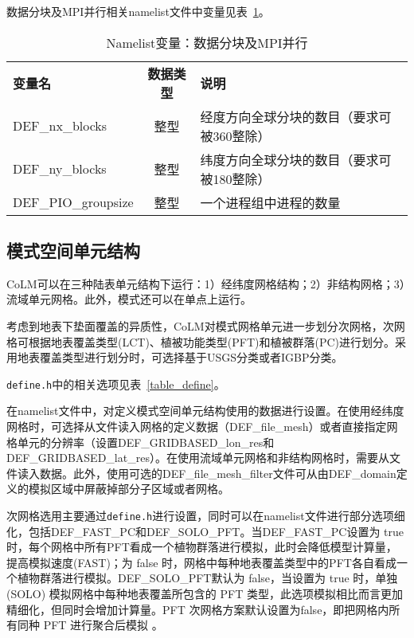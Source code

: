 \documentclass[a4paper,12pt,twoside]{article}
\begin{document}
数据分块及MPI并行相关namelist文件中变量见表~\ref{table_nl_blocks_mpi}。

\begin{table}[!htbp]
\caption{Namelist变量：数据分块及MPI并行} \label{table_nl_blocks_mpi}
\centering \renewcommand{\arraystretch}{1.5}
\begin{tabular}{lcl}
\toprule
\textbf{变量名} & \textbf{数据类型} & \textbf{说明} \\
DEF\_nx\_blocks & 整型 & 经度方向全球分块的数目（要求可被360整除）\\
DEF\_ny\_blocks & 整型 & 纬度方向全球分块的数目（要求可被180整除）\\
DEF\_PIO\_groupsize & 整型 & 一个进程组中进程的数量 \\
\bottomrule
\end{tabular} 
\end{table}

\subsection{模式空间单元结构}

CoLM可以在三种陆表单元结构下运行：1）经纬度网格结构；2）非结构网格；3）流域单元网格。此外，模式还可以在单点上运行。

考虑到地表下垫面覆盖的异质性，CoLM对模式网格单元进一步划分次网格，次网格可根据地表覆盖类型(LCT)、植被功能类型(PFT)和植被群落(PC)进行划分。采用地表覆盖类型进行划分时，可选择基于USGS分类或者IGBP分类。

\texttt{define.h}中的相关选项见表~\ref{table_define}。

在namelist文件中，对定义模式空间单元结构使用的数据进行设置。在使用经纬度网格时，可选择从文件读入网格的定义数据（DEF\_file\_mesh）或者直接指定网格单元的分辨率（设置DEF\_GRIDBASED\_lon\_res和DEF\_GRIDBASED\_lat\_res）。在使用流域单元网格和非结构网格时，需要从文件读入数据。此外，使用可选的DEF\_file\_mesh\_\allowbreak filter文件可从由DEF\_domain定义的模拟区域中屏蔽掉部分子区域或者网格。

次网格选用主要通过\texttt{define.h}进行设置，同时可以在namelist文件进行部分选项细化，包括DEF\_FAST\_PC和DEF\_SOLO\_PFT。当DEF\_FAST\_PC设置为 true 时，每个网格中所有PFT看成一个植物群落进行模拟，此时会降低模型计算量，提高模拟速度(FAST)；为 false 时，网格中每种地表覆盖类型中的PFT各自看成一个植物群落进行模拟。DEF\_SOLO\_PFT默认为 false，当设置为 true 时，单独 (SOLO) 模拟网格中每种地表覆盖所包含的 PFT 类型，此选项模拟相比而言更加精细化，但同时会增加计算量。PFT 次网格方案默认设置为false，即把网格内所有同种 PFT 进行聚合后模拟 。
\end{document}
